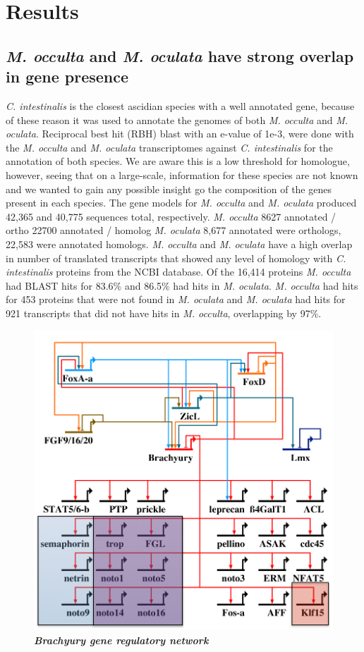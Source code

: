 \section{Results}
\subsection{\textit{M. occulta} and \textit{M. oculata} have strong overlap in gene presence}
\textit{C. intestinalis} is the closest ascidian species with a well annotated gene, because of these reason it was used to annotate the genomes of both \textit{M. occulta} and \textit{M. oculata}. Reciprocal best hit (RBH) blast with an e-value of 1e-3, were done with the \textit{M. occulta} and \textit{M. oculata} transcriptomes against \textit{C. intestinalis} for the annotation of both species.  We are aware this is a low threshold for homologue, however, seeing that on a large-scale, information for these species are not known and we wanted to gain any possible insight go the composition of the genes present in each species. The gene models for \textit{M. occulta} and \textit{M. oculata} produced 42,365 and 40,775 sequences total, respectively. \textit{M. occulta} 8627 annotated / ortho 22700 annotated / homolog \textit{M. oculata} 8,677 annotated were orthologs, 22,583 were annotated homologs. \textit{M. occulta} and \textit{M. oculata} have a high overlap in number of translated transcripts that showed any level of homology with \textit{C. intestinalis} proteins from the NCBI database. Of the 16,414  proteins \textit{M. occulta} had BLAST hits for 83.6\% and 86.5\% had hits in \textit{M. oculata}. \textit{M. occulta} had hits for 453 proteins that were not found in \textit{M. oculata} and \textit{M. oculata} had hits for 921 transcripts that did not have hits in \textit{M. occulta}, overlapping by 97\%.

\begin{figure}[tbp]
\centering
\includegraphics[scale=0.55]{figures/bra_grn.pdf}
\caption{\textbf{\textit{Brachyury gene regulatory network} }}
\label{fig:bra_grn}
\end{figure}
